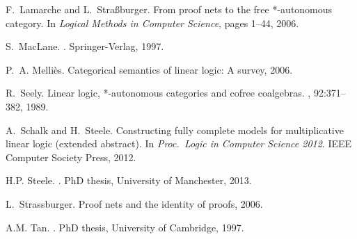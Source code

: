 \documentclass{LMCS}
\theoremstyle{plain}\newtheorem*{cLm}{Claim}
\begin{document}
\begin{thebibliography}{DHPP99}
F.~Lamarche and L.~Stra{\ss}burger.
\newblock From proof nets to the free *-autonomous category.
\newblock In {\em Logical Methods in Computer Science}, pages 1--44, 2006.

S.\ MacLane.
.
\newblock Springer-Verlag, 1997.

P.~A. Melli\`{e}s.
\newblock Categorical semantics of linear logic: A survey, 2006.

R.~Seely.
\newblock Linear logic, *-autonomous categories and cofree coalgebras.
, 92:371--382, 1989.

A.~Schalk and H.~Steele.
\newblock Constructing fully complete models for multiplicative linear logic
  (extended abstract).
\newblock In {\em {Proc.\ Logic in Computer Science 2012}}. IEEE Computer
  Society Press, 2012.

H.P. Steele.
.
\newblock PhD thesis, University of Manchester, 2013.

L.~Strassburger.
\newblock Proof nets and the identity of proofs, 2006.

A.M. Tan.
.
\newblock PhD thesis, University of Cambridge, 1997.

\end{thebibliography}
\end{document}
